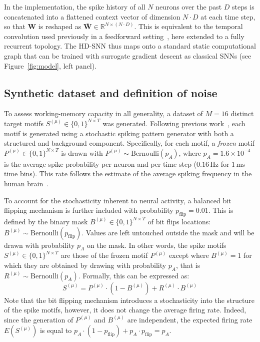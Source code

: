 \documentclass{scrartcl}
\newcommand{\citep}[1]{\parencite{#1}}
\begin{document}
In the implementation, the spike history of all $N$ neurons over the past $D$ steps is concatenated into a flattened context vector of dimension $N \cdot D$ at each time step, so that $\mathbf{W}$ is reshaped as $\mathbf{\bar W} \in \mathbb{R}^{N \times (N \cdot D)}$. This is equivalent to the temporal convolution used previously in a feedforward setting~\citep{Perrinet2023}, here extended to a fully recurrent topology. The HD-SNN thus maps onto a standard static computational graph that can be trained with surrogate gradient descent as classical SNNs (see Figure~\ref{fig:model}, left panel).


\subsection{Synthetic dataset and definition of noise}
To assess working-memory capacity in all generality, a dataset of $M = 16$ distinct target motifs $S^{(\mu)} \in \{0,1\}^{N \times T}$ was generated. Following previous work~\citep{Perrinet2023}, each motif is generated using a stochastic spiking pattern generator with both a structured and background component. Specifically, for each motif, a \emph{frozen} motif $P^{(\mu)} \in \{0,1\}^{N \times T}$ is drawn with $P^{(\mu)} \sim \mathrm{Bernoulli}(p_A)$, where $p_A = 1.6 \times 10^{-4}$ is the average spike probability per neuron and per time step ($0.16\,\mathrm{Hz}$ for $1\,\mathrm{ms}$ time bins). This rate follows the estimate of the average spiking frequency in the human brain~\citep{Lennie2003}.

To account for the stochasticity inherent to neural activity, a balanced bit flipping mechanism is further included with probability $p_\mathrm{flip} = 0.01$. This is defined by the binary mask  $B^{(\mu)} \in \{0,1\}^{N \times T}$ of bit flips locations:
$
  B^{(\mu)} \sim \mathrm{Bernoulli}(p_\mathrm{flip})
  $.
Values are left untouched outside the mask and will be drawn with probability $p_A$ on the mask. In other words, the spike motifs $S^{(\mu)} \in \{0,1\}^{N \times T}$ are those of the frozen motif $P^{(\mu)}$ except where $B^{(\mu)} = 1$ for which they are obtained by drawing with probability $p_A$, that is $R^{(\mu)} \sim \mathrm{Bernoulli}(p_A)$. Formally, this can be expressed as:
\begin{equation}
  S^{(\mu)} = P^{(\mu)} \cdot (1 - B^{(\mu)}) + R^{(\mu)} \cdot B^{(\mu)}
  \label{eq:pattern_generation}
\end{equation}
Note that the bit flipping mechanism introduces a stochasticity into the structure of the spike motifs, however, it does not change the average firing rate. Indeed, since the generation of $P^{(\mu)}$ and $B^{(\mu)}$ are independent, the expected firing rate $E(S^{(\mu)})$ is equal to $p_A \cdot (1 - p_\mathrm{flip}) + p_A \cdot p_\mathrm{flip} = p_A$.
%
\end{document}
